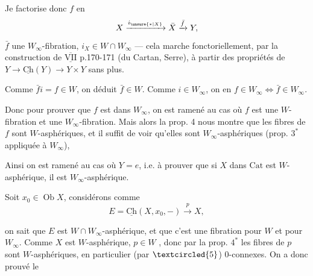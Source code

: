 


Je factorise donc $f$ en
\[
 X\xrightarrow{i_{\unsure{*|X}}}\bar X\xrightarrow{\bar f}Y,
\]
 $\bar f$ une $W_\infty$-fibration, $i_X\in W\cap W_\infty$ --- cela marche fonctoriellement, par la construction de $\overline{\underline{\mathrm{VII}}}$ p.170-171 (du Cartan, Serre), à partir des propriétés de $Y\to\underline{\mathrm{Ch}}(Y)\to Y\times Y$ sans plus.

 Comme $\bar f i=f\in W$, on déduit $\bar f\in W$.  Comme $i\in W_\infty$, on en  $f\in W_\infty\Longleftrightarrow\bar f\in W_\infty$.

Donc pour prouver que $f$ est dans $W_\infty$, on est ramené au cas où $f$ est une $W$-fibration et une $W_\infty$-fibration. Mais alors la prop. 4 nous montre que les fibres de $f$ sont $W$-asphériques, et il suffit de voir qu'elles sont $W_\infty$-asphériques (prop. $3^*$ appliquée à $W_\infty$),



Ainsi on est ramené au cas où $Y=e$, i.e. à prouver que si $X$ dans $\mathrm{Cat}$ est $W$-asphérique, il est $W_\infty$-asphérique.  

Soit $x_0\in\operatorname{Ob}X$, considérons comme 
\[
 E=\underline{\mathrm{Ch}}(X,x_0,-)\xrightarrow{p}X,
\]

on sait que $E$ est $W\cap W_\infty$-asphérique, et que c'est une fibration pour $W$ et pour $W_\infty$. Comme $X$ est $W$-asphérique, $p\in W$ , donc  par la prop. $4^*$ les fibres de $p$ sont $W$-asphériques, en particulier (par $\textcircled{5}$) $0$-connexes. On a donc prouvé le


